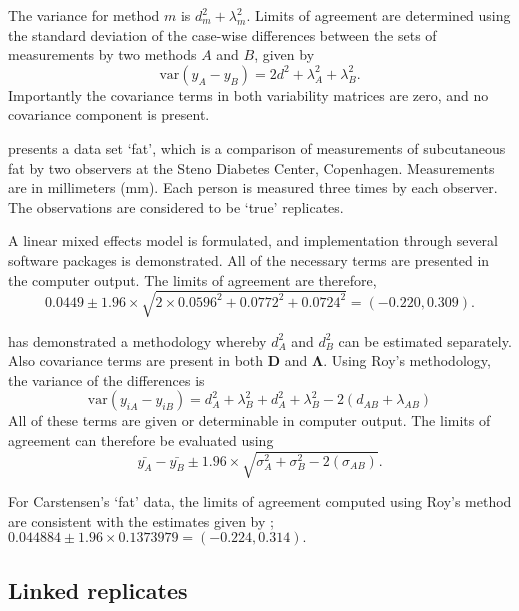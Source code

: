 \documentclass[12pt, a4paper]{report}
\theoremstyle{plain}
\theoremstyle{definition}
\theoremstyle{remark}
\begin{document}
The variance for method $m$ is $d^2_{m}+\lambda^2_{m}$. Limits of agreement are determined using the standard deviation of the case-wise differences between the sets of measurements by two methods $A$ and $B$, given by
\begin{equation}
\mbox{var} (y_{A}-y_{B}) = 2d^2 + \lambda^2_{A}+ \lambda^2_{B}.
\end{equation}
Importantly the covariance terms in both variability matrices are zero, and no covariance component is present.

\citet{BXC2008} presents a data set `fat', which is a comparison of measurements of subcutaneous fat
by two observers at the Steno Diabetes Center, Copenhagen. Measurements are in millimeters
(mm). Each person is measured three times by each observer. The observations are considered to be `true' replicates.

A linear mixed effects model is formulated, and implementation through several software packages is demonstrated.
All of the necessary terms are presented in the computer output. The limits of agreement are therefore,
\begin{equation}
0.0449  \pm 1.96 \times  \sqrt{2 \times 0.0596^2 + 0.0772^2 + 0.0724^2} = (-0.220,  0.309).
\end{equation}

\citet{roy} has demonstrated a methodology whereby $d^2_{A}$ and $d^2_{B}$ can be estimated separately. Also covariance terms are present in both $\boldsymbol{D}$ and $\boldsymbol{\Lambda}$. Using Roy's methodology, the variance of the differences is
\begin{equation}
\mbox{var} (y_{iA}-y_{iB})= d^2_{A} + \lambda^2_{B} + d^2_{A} + \lambda^2_{B} - 2(d_{AB} + \lambda_{AB})
\end{equation}
All of these terms are given or determinable in computer output.
The limits of agreement can therefore be evaluated using
\begin{equation}
\bar{y_{A}}-\bar{y_{B}} \pm 1.96 \times \sqrt{ \sigma^2_{A} + \sigma^2_{B}  - 2(\sigma_{AB})}.
\end{equation}

For Carstensen's `fat' data, the limits of agreement computed using Roy's
method are consistent with the estimates given by \citet{BXC2008}; $0.044884  \pm 1.96 \times  0.1373979 = (-0.224,  0.314).$

\subsection{Linked replicates}
\end{document}
